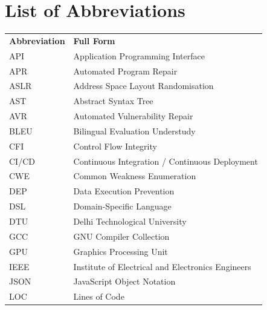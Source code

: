 \chapter*{List of Abbreviations}

\vspace{0.5cm}

\renewcommand{\arraystretch}{1.4}
\begin{tabular}{p{3cm} p{10.5cm}}
\textbf{Abbreviation} & \textbf{Full Form} \\[0.3cm]
API     & Application Programming Interface \\
APR     & Automated Program Repair \\
ASLR    & Address Space Layout Randomisation \\
AST     & Abstract Syntax Tree \\
AVR     & Automated Vulnerability Repair \\
BLEU    & Bilingual Evaluation Understudy \\
CFI     & Control Flow Integrity \\
CI/CD   & Continuous Integration / Continuous Deployment \\
CWE     & Common Weakness Enumeration \\
DEP     & Data Execution Prevention \\
DSL     & Domain-Specific Language \\
DTU     & Delhi Technological University \\
GCC     & GNU Compiler Collection \\
GPU     & Graphics Processing Unit \\
IEEE    & Institute of Electrical and Electronics Engineers \\
JSON    & JavaScript Object Notation \\
LOC     & Lines of Code \\
\end{tabular}
